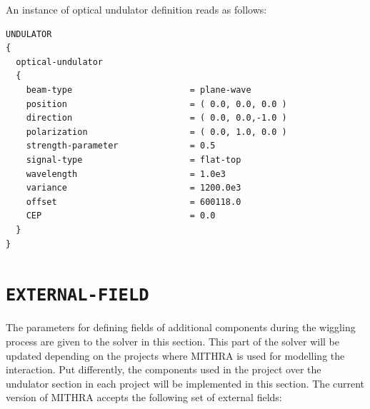 %
An instance of optical undulator definition reads as follows:
%
\begin{snugshade}
\begin{Verbatim}[fontsize=\small, tabsize = 4]
UNDULATOR
{
  optical-undulator
  {
    beam-type                       = plane-wave
    position                        = ( 0.0, 0.0, 0.0 )
    direction                       = ( 0.0, 0.0,-1.0 )
    polarization                    = ( 0.0, 1.0, 0.0 )
    strength-parameter              = 0.5
    signal-type                     = flat-top
    wavelength                      = 1.0e3
    variance                        = 1200.0e3
    offset                          = 600118.0
    CEP                             = 0.0
  }
}
\end{Verbatim}
\end{snugshade}

\section{\texttt{EXTERNAL-FIELD}}

The parameters for defining fields of additional components during the wiggling process are given to the solver in this section.
%
This part of the solver will be updated depending on the projects where MITHRA is used for modelling the interaction.
%
Put differently, the components used in the project over the undulator section in each project will be implemented in this section.
%
The current version of MITHRA accepts the following set of external fields:

